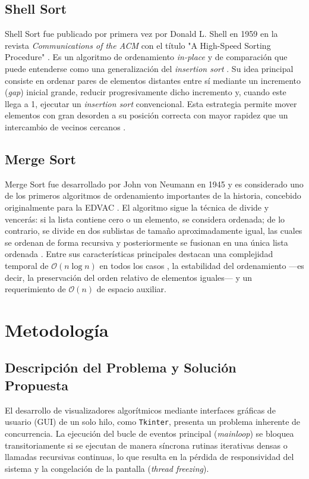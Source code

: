\documentclass[conference]{IEEEtran}
\begin{document}
\subsection{Shell Sort}
Shell Sort fue publicado por primera vez por Donald L. Shell en 1959 en la revista \textit{Communications of the ACM} con el título "A High-Speed Sorting Procedure" \cite{shell1959}. Es un algoritmo de ordenamiento \textit{in-place} y de comparación que puede entenderse como una generalización del \textit{insertion sort} \cite{knuth1973}. Su idea principal consiste en ordenar pares de elementos distantes entre sí mediante un incremento (\textit{gap}) inicial grande, reducir progresivamente dicho incremento y, cuando este llega a 1, ejecutar un \textit{insertion sort} convencional. Esta estrategia permite mover elementos con gran desorden a su posición correcta con mayor rapidez que un intercambio de vecinos cercanos \cite{knuth1973}.

\subsection{Merge Sort}
Merge Sort fue desarrollado por John von Neumann en 1945 \cite{vonneumann1945} y es considerado uno de los primeros algoritmos de ordenamiento importantes de la historia, concebido originalmente para la EDVAC \cite{vonneumann1945}. El algoritmo sigue la técnica de divide y vencerás: si la lista contiene cero o un elemento, se considera ordenada; de lo contrario, se divide en dos sublistas de tamaño aproximadamente igual, las cuales se ordenan de forma recursiva y posteriormente se fusionan en una única lista ordenada \cite[pp.~158--168]{knuth1973}. Entre sus características principales destacan una complejidad temporal de $\mathcal{O}(n \log n)$ en todos los casos \cite{knuth1973}, la estabilidad del ordenamiento —es decir, la preservación del orden relativo de elementos iguales— y un requerimiento de $\mathcal{O}(n)$ de espacio auxiliar.


\section{Metodología}

\subsection{Descripción del Problema y Solución Propuesta}
El desarrollo de visualizadores algorítmicos mediante interfaces gráficas de usuario (GUI) de un solo hilo, como \texttt{Tkinter}, presenta un problema inherente de concurrencia. La ejecución del bucle de eventos principal (\textit{mainloop}) se bloquea transitoriamente si se ejecutan de manera síncrona rutinas iterativas densas o llamadas recursivas continuas, lo que resulta en la pérdida de responsividad del sistema y la congelación de la pantalla (\textit{thread freezing}). 
\end{document}
